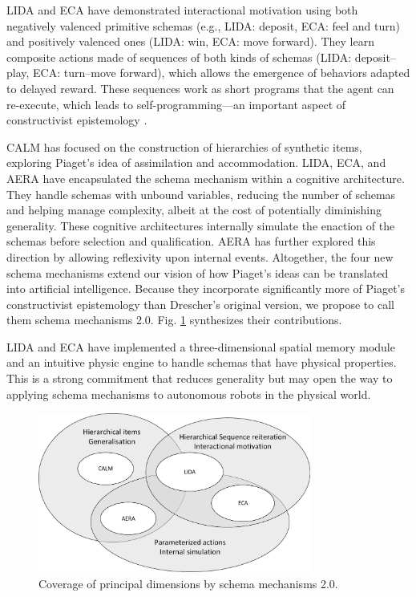 \documentclass[runningheads]{llncs}
\begin{document}
LIDA and ECA have demonstrated interactional motivation using both negatively valenced primitive schemas (e.g., LIDA: deposit, ECA: feel and turn) and positively valenced ones (LIDA: win, ECA: move forward).
They learn composite actions made of sequences of both kinds of schemas (LIDA: deposit--play, ECA: turn--move forward), which allows the emergence of behaviors adapted to delayed reward.
These sequences work as short programs that the agent can re-execute,  which leads to self-programming---an important aspect of constructivist epistemology \cite{georgeon_cash_2019}.

CALM has focused on the construction of hierarchies of synthetic items, exploring Piaget's idea of assimilation and accommodation. 
LIDA, ECA, and AERA have encapsulated the schema mechanism within a cognitive architecture. 
They handle schemas with unbound variables, reducing the number of schemas and helping manage complexity, albeit at the cost of potentially diminishing generality. 
These cognitive architectures internally simulate the enaction of the schemas before selection and qualification. 
AERA has further explored this direction by allowing reflexivity upon internal events. 
Altogether, the four new schema mechanisms extend our vision of how Piaget's ideas can be translated into artificial intelligence. 
Because they incorporate significantly more of Piaget's constructivist epistemology than Drescher's original version, we propose to call them schema mechanisms 2.0. 
Fig. \ref{fig:venn} synthesizes their contributions. 

LIDA and ECA have implemented a three-dimensional spatial memory module and an intuitive physic engine to handle schemas that have physical properties. 
This is a strong commitment that reduces generality but may open the way to applying schema mechanisms to autonomous robots in the physical world. 





\begin{figure}
	\centering
	\includegraphics[width=0.8\textwidth]{Figure_venn.pdf}
	\caption{Coverage of principal dimensions by schema mechanisms 2.0.} 
	\label{fig:venn}
\end{figure}
\end{document}
